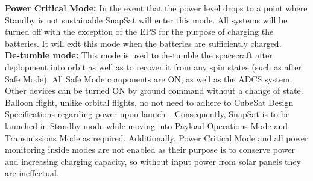 \noindent
\textbf{Power Critical Mode: } In the event that the power level drops to a point where Standby is not sustainable SnapSat will enter this mode.  All systems will be turned off with the exception of the EPS for the purpose of charging the batteries.  It will exit this mode when the batteries are sufficiently charged. \\
\noindent
\textbf{De-tumble mode: } This mode is used to de-tumble the spacecraft after deplopment into orbit as well as to recover it from any spin states (such as after Safe Mode). All Safe Mode components are ON, as well as the ADCS system. Other devices can be turned ON by ground command without a change of state. \\

Balloon flight, unlike orbital flights, no not need to adhere to CubeSat Design Specifications regarding power upon launch~\cite{cds}. Consequently, SnapSat is to be launched in Standby mode while moving into Payload Operations Mode and Transmissions Mode as required.  Additionally, Power Critical Mode and all power monitoring inside modes are not enabled as their purpose is to conserve power and increasing charging capacity, so without input power from solar panels they are ineffectual.